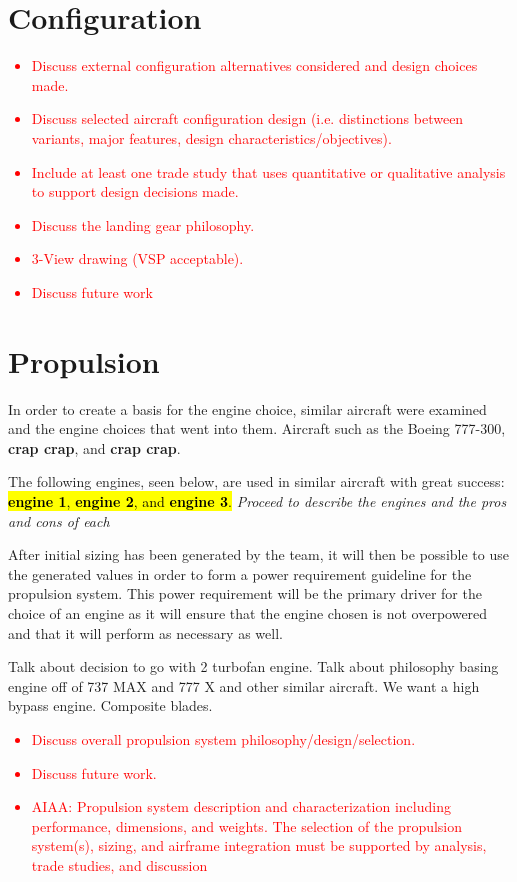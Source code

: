 \documentclass[conf]{new-aiaa}
\begin{document}
\section{Configuration}
\textcolor{red}{
\begin{itemize}
    \item Discuss external configuration alternatives considered and design choices made.
    \item Discuss selected aircraft configuration design (i.e. distinctions between variants, major features, design characteristics/objectives).
    \item Include at least one trade study that uses quantitative or qualitative analysis to support design decisions made.
    \item Discuss the landing gear philosophy.
    \item 3-View drawing (VSP acceptable).
    \item Discuss future work
\end{itemize}}

\section{Propulsion}

In order to create a basis for the engine choice, similar aircraft were examined and the engine choices that went into them. Aircraft such as the Boeing 777-300, \textbf{crap crap}, and \textbf{crap crap}.

The following engines, seen below, are used in similar aircraft with great success: \hl{\textbf{engine 1}, \textbf{engine 2}, and \textbf{engine 3}.} \textit{Proceed to describe the engines and the pros and cons of each}

After initial sizing has been generated by the team, it will then be possible to use the generated values in order to form a power requirement guideline for the propulsion system. This power requirement will be the primary driver for the choice of an engine as it will ensure that the engine chosen is not overpowered and that it will perform as necessary as well.  

Talk about decision to go with 2 turbofan engine. Talk about philosophy basing engine off of 737 MAX and 777 X and other similar aircraft. We want a high bypass engine. Composite blades.

\textcolor{red}{
\begin{itemize}
    \item Discuss overall propulsion system philosophy/design/selection.
    \item Discuss future work.
    \item AIAA: Propulsion system description and characterization including performance,
    dimensions, and weights. The selection of the propulsion system(s), sizing, and
    airframe integration must be supported by analysis, trade studies, and discussion
\end{itemize}}
\end{document}

